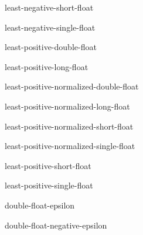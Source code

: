 \documentclass[10pt,english]{book}
\begin{document}
\begin{constant}{least-negative-short-float}{}
  
\end{constant}

\begin{constant}{least-negative-single-float}{}
  
\end{constant}

\begin{constant}{least-positive-double-float}{}
  
\end{constant}

\begin{constant}{least-positive-long-float}{}
  
\end{constant}

\begin{constant}{least-positive-normalized-double-float}{}
  
\end{constant}

\begin{constant}{least-positive-normalized-long-float}{}
  
\end{constant}

\begin{constant}{least-positive-normalized-short-float}{}
  
\end{constant}

\begin{constant}{least-positive-normalized-single-float}{}
  
\end{constant}

\begin{constant}{least-positive-short-float}{}
  
\end{constant}

\begin{constant}{least-positive-single-float}{}
  
\end{constant}

\begin{constant}{double-float-epsilon}{}
  
\end{constant}

\begin{constant}{double-float-negative-epsilon}{}
  
\end{constant}
\end{document}
